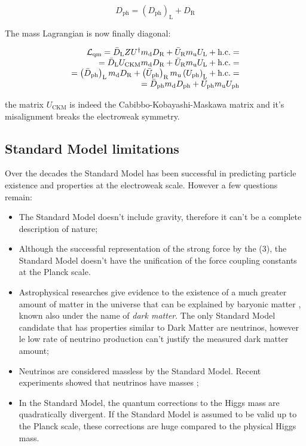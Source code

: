 \begin{equation}
D_{\text{ph}} = \left(D_{\text{ph}}\right)_{\text{L}} + D_{\text{R}}
\end{equation}

The mass Lagrangian is now finally diagonal:

\begin{equation}
\begin{array}{r c l}
\mathcal{L}_{\text{qm}} = \bar{D}_{\text{L}}ZU^{\dagger}m_{\text{d}}D_{\text{R}} + \bar{U}_{\text{R}}m_{\text{u}}U_{\text{L}} + \text{h.c.} = \\
= \bar{D}_{\text{L}}U_{\text{CKM}}m_{\text{d}}D_{\text{R}} + \bar{U}_{\text{R}}m_{\text{u}}U_{\text{L}} + \text{h.c.} = \\
=  \left(\bar{D}_{\text{ph}}\right)_{\text{L}}m_{\text{d}}D_{\text{R}} + \left(\bar{U}_{\text{ph}}\right)_{\text{R}}m_{\text{u}}\left(U_{\text{ph}}\right)_{\text{L}} + \text{h.c.} = \\
= \bar{D}_{\text{ph}}m_{\text{d}}D_{\text{ph}} + \bar{U}_{\text{ph}}m_{\text{u}}U_{\text{ph}}
\label{eq::Lqm_Uckm_diagonal}
\end{array}
\end{equation}

the matrix $U_{\text{CKM}}$ is indeed the Cabibbo-Kobayashi-Maskawa matrix and it's misalignment breaks the electroweak symmetry.

\subsection{Standard Model limitations}

Over the decades the Standard Model has been successful in predicting particle existence and properties at the electroweak scale. However a few questions remain:

\begin{itemize}
	\item The Standard Model doesn't include gravity, therefore it can't be a complete description of nature;
	\item Although the successful representation of the strong force by the (3), the Standard Model doesn't have the unification of the force coupling constants at the Planck scale.
	\item Astrophysical researches give evidence to the existence of a much greater amount of matter in the universe that can be explained by baryonic matter \cite{deBoer:2005tm}, known also under the name of \textit{dark matter}. The only Standard Model candidate that has properties similar to Dark Matter are neutrinos, however le low rate of neutrino production can't justify the measured dark matter amount;
	\item Neutrinos are considered massless by the Standard Model. Recent experiments showed that neutrinos have masses \cite{Fukuda:1998mi};
	\item In the Standard Model, the quantum corrections to the Higgs mass are quadratically divergent. If the Standard Model is assumed to be valid up to the Planck scale, these corrections are huge compared to the physical Higgs mass.
\end{itemize}

